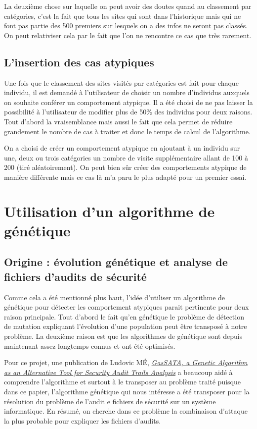 \documentclass[a4paper, 11pt]{article}
\begin{document}
La deuxième chose sur laquelle on peut avoir des doutes quand au classement par catégories, c'est la fait que tous les sites qui sont dans l'historique mais qui ne font pas partie des 500 premiers sur lesquels on a des infos ne seront pas classés. On peut relativiser cela par le fait que l'on ne rencontre ce cas que très rarement.

\subsection{L'insertion des cas atypiques}

Une fois que le classement des sites visités par catégories est fait pour chaque individu, il est demandé à l'utilisateur de choisir un nombre d'individus auxquels on souhaite conférer un comportement atypique. Il a été choisi de ne pas laisser la possibilité à l'utilisateur de modifier plus de 50\% des individus pour deux raisons. Tout d'abord la vraisemblance mais aussi le fait que cela permet de réduire grandement le nombre de cas à traiter et donc le temps de calcul de l'algorithme.

On a choisi de créer un comportement atypique en ajoutant à un individu sur une, deux ou trois catégories un nombre de visite supplémentaire allant de 100 à 200 (tiré aléatoirement). On peut bien sûr créer des comportements atypique de manière différente mais ce cas là m'a paru le plus adapté pour un premier essai.


\section{Utilisation d'un algorithme de génétique}
\subsection{Origine : évolution génétique et analyse de fichiers d'audits de sécurité}

Comme cela a été mentionné plus haut, l'idée d'utiliser un algorithme de génétique pour détecter les comportement atypiques parait pertinente pour deux raison principale. Tout d'abord le fait qu'en génétique le problème de détection de mutation expliquant l'évolution d'une population peut être transposé à notre problème. La deuxième raison est que les algorithmes de génétique sont depuis maintenant assez longtemps connus et ont été optimisés.

Pour ce projet, une publication de Ludovic MÉ, \href{http://www.rennes.supelec.fr/ren/perso/lme/PUBLI/raid98.pdf}{\emph{GasSATA, a Genetic Algorithm as an Alternative Tool for Security Audit Trails Analysis}} a beaucoup aidé à comprendre l'algorithme et surtout à le transposer au problème traité puisque dans ce papier, l'algorithme génétique qui nous intéresse  a été transposer pour la résolution du problème de l'audit e fichiers de sécurité sur un système informatique. En résumé, on cherche dans ce problème la combinaison d'attaque la plus probable pour expliquer les fichiers d'audits.
\end{document}
